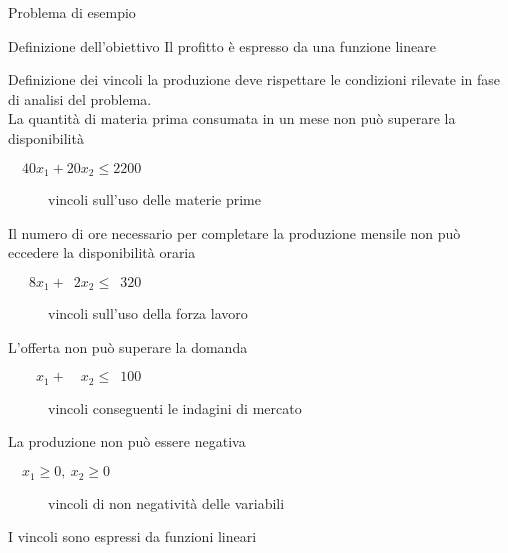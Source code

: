 \documentclass{beamer}
\begin{document}
\begin{frame}[allowframebreaks]{Problema di esempio}
\begin{block}{Definizione dell'obiettivo}
  Il profitto \`e espresso da una funzione lineare
\end{block}

\begin{block}{Definizione dei vincoli}
la produzione deve rispettare  le condizioni rilevate
in fase di analisi del problema.\\

La quantit\`a di materia prima consumata in un mese non pu\`o superare la disponibilit\`a
\begin{description}
 \item[$\quad 40 x_1 + 20 x_2 \leq 2200$]
      vincoli sull'uso delle materie prime
\end{description}

Il numero di ore necessario per completare la produzione mensile non pu\`o eccedere
la disponibilit\`a oraria
\begin{description}
 \item[$\quad \phantom{4}8 x_1 + \phantom{2}2 x_2 \leq \phantom{2}320$]
      vincoli sull'uso della forza lavoro
\end{description}
 
 L'offerta non pu\`o superare la domanda
\begin{description}
 \item[$\quad \phantom{40} x_1 + \phantom{20} x_2 \leq \phantom{2}100$]
      vincoli conseguenti le indagini di mercato
\end{description}

La produzione non pu\`o essere negativa
\begin{description}
 \item[$\quad x_1 \geq 0,\ x_2 \geq 0$]
      vincoli di non negativit\`a delle variabili
\end{description}

  I vincoli sono espressi da funzioni lineari
\end{block}

\framebreak

\end{frame}
\end{document}
